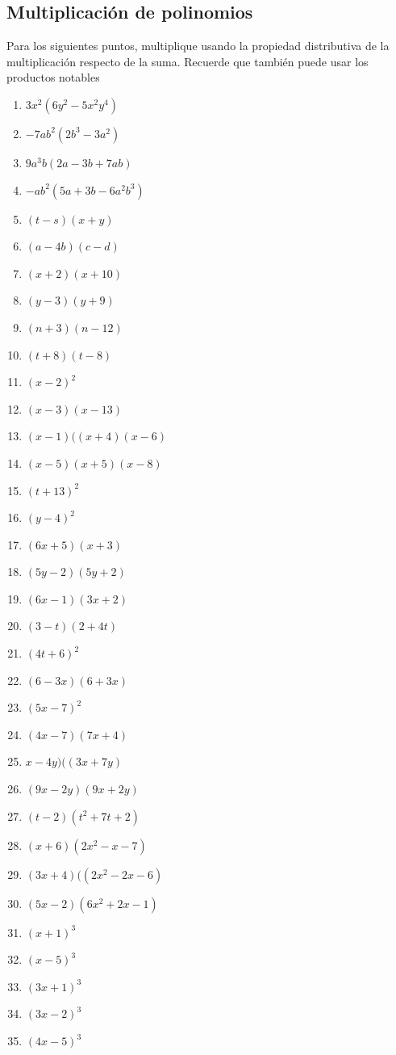 \documentclass[letterpaper,11pt,twoside]{article}
\begin{document}
\begin{multicols}{2}
 \section*{Multiplicaci\'{o}n de polinomios}
 Para los siguientes puntos, multiplique usando la propiedad distributiva de la multiplicaci\'{o}n respecto de la suma. Recuerde que tambi\'{e}n puede usar los productos notables
 \begin{enumerate}
 \item $3x^{2}(6y^{2}-5x^{2}y^{4})$
 \item $-7ab^{2}(2b^{3}-3a^{2})$
 \item $9a^{3}b(2a-3b+7ab)$
 \item $-ab^{2}(5a+3b-6a^{2}b^{3})$
 \item $(t-s)(x+y)$
 \item $(a-4b)(c-d)$
 \item $(x+2)(x+10)$
 \item $(y-3)(y+9)$
 \item $(n+3)(n-12)$
 \item $(t+8)(t-8)$
 \item $(x-2)^{2}$
 \item $(x-3)(x-13)$
 \item $(x-1)((x+4)(x-6)$
 \item $(x-5)(x+5)(x-8)$
 \item $(t+13)^{2}$
 \item $(y-4)^{2}$
 \item $(6x+5)(x+3)$
 \item $(5y-2)(5y+2)$
 \item $(6x-1)(3x+2)$
 \item $(3-t)(2+4t)$
 \item $(4t+6)^{2}$
 \item $(6-3x)(6+3x)$
 \item $(5x-7)^{2}$
 \item $(4x-7)(7x+4)$
 \item $x-4y)((3x+7y)$
 \item $(9x-2y)(9x+2y)$
 \item $(t-2)(t^{2}+7t+2)$
 \item $(x+6)(2x^{2}-x-7)$
 \item $(3x+4)((2x^{2}-2x-6)$
 \item $(5x-2)(6x^{2}+2x-1)$
 \item $(x+1)^{3}$
 \item $(x-5)^{3}$
 \item $(3x+1)^{3}$
 \item $(3x-2)^{3}$
 \item $(4x-5)^{3}$
 

\end{enumerate}
\end{multicols}
\end{document}
